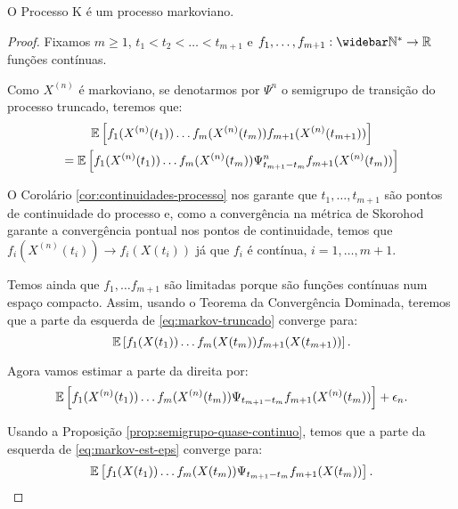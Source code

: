 \begin{teorema}
  \label{teo:proc_markov}
  O Processo K é um processo markoviano.
\end{teorema}

\begin{proof}
  Fixamos $m \geq 1$, $t_1 < t_2 < \ldots < t_{m+1}$ e $f_1, \ldots,
  f_{m+1} : \Nzb \to \R$ funções contínuas.

  Como $X^{(n)}$ é markoviano, se denotarmos por $\Psi^n$ o semigrupo
  de transição do processo truncado, teremos que:
  \begin{gather}
    \label{eq:markov-truncado}
    {\mathbb{E}} \left[
      f_{1}(X^{(n)}(t_{1})) 
      \ldots
      f_{m}(X^{(n)}(t_{m})) 
      f_{m+1}(X^{(n)}(t_{m+1})) 
    \right] \\
    = {\mathbb{E}} \left[
      f_{1}(X^{(n)}(t_{1})) 
      \ldots
      f_{m}(X^{(n)}(t_{m})) 
      \Psi^n_{t_{m+1} - t_{m}} f_{m+1} (X^{(n)}(t_{m})) 
    \right]\notag
  \end{gather}

  O Corolário \ref{cor:continuidades-processo} nos garante que \qc
  $t_1, \ldots, t_{m+1}$ são pontos de continuidade do processo e,
  como a convergência na métrica de Skorohod garante a convergência
  pontual nos pontos de continuidade, temos que $f_i(X^{(n)}(t_i)) \to
  f_i(X(t_i))$ \qc já que $f_i$ é contínua, $i = 1, \ldots, m+1$.

  Temos ainda que $f_1, \ldots f_{m+1}$ são limitadas porque são
  funções contínuas num espaço compacto. Assim, usando o Teorema da
  Convergência Dominada, teremos que a parte da esquerda de
  \eqref{eq:markov-truncado} converge para:
  \begin{displaymath}
    {\mathbb{E}} \left[
      f_{1}(X(t_{1})) 
      \ldots
      f_{m}(X(t_{m})) 
      f_{m+1}(X(t_{m+1})) 
    \right].
  \end{displaymath}

  Agora vamos estimar a parte da direita por:
  \begin{equation}
    \label{eq:markov-est-eps}
    {\mathbb{E}} \left[
      f_{1}(X^{(n)}(t_{1})) 
      \ldots
      f_{m}(X^{(n)}(t_{m})) 
      \Psi_{t_{m+1} - t_{m}} f_{m+1} (X^{(n)}(t_{m})) 
    \right] + \epsilon_n.
  \end{equation}

  Usando a Proposição \ref{prop:semigrupo-quase-continuo}, temos que a
  parte da esquerda de \eqref{eq:markov-est-eps} converge para:
  \begin{displaymath}
    {\mathbb{E}} \left[
      f_{1}(X(t_{1})) 
      \ldots
      f_{m}(X(t_{m})) 
      \Psi_{t_{m+1} - t_{m}} f_{m+1} (X(t_{m})) 
    \right].
  \end{displaymath}


\end{proof}
